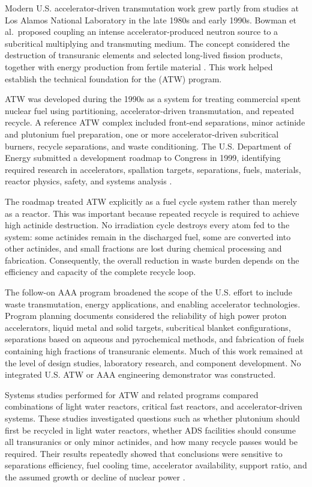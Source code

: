 Modern U.S. accelerator-driven transmutation work grew partly from studies at
Los Alamos National Laboratory in the late 1980s and early 1990s. Bowman
et al.\ proposed coupling an intense accelerator-produced neutron source to a
subcritical multiplying and transmuting medium. The concept considered the
destruction of transuranic elements and selected long-lived fission products,
together with energy production from fertile material
\cite{bowman_nuclear_1992}. This work helped establish the
technical foundation for the (\gls{ATW})
program.

\gls{ATW} was developed during the 1990s as a system for treating commercial spent
nuclear fuel using partitioning, accelerator-driven transmutation, and
repeated recycle. A reference \gls{ATW} complex included front-end separations,
minor actinide and plutonium fuel preparation, one or more accelerator-driven
subcritical burners, recycle separations, and waste conditioning. The U.S.
Department of Energy submitted a development roadmap to Congress in 1999,
identifying required research in accelerators, spallation targets, separations,
fuels, materials, reactor physics, safety, and systems analysis
\cite{vantuyleRoadmapDevelopingATW2001,bellerUSAcceleratorTransmutation2001}.

The roadmap treated \gls{ATW} explicitly as a fuel cycle system rather than merely
as a reactor. This was important because repeated recycle is required to
achieve high actinide destruction. No irradiation cycle destroys every atom
fed to the system: some actinides remain in the discharged fuel, some are
converted into other actinides, and small fractions are lost during chemical
processing and fabrication. Consequently, the overall reduction in waste
burden depends on the efficiency and capacity of the complete recycle loop.

The follow-on \gls{AAA} program broadened the
scope of the U.S. effort to include waste transmutation, energy applications,
and enabling accelerator technologies. Program planning documents considered
the reliability of high power proton accelerators, liquid metal and solid
targets, subcritical blanket configurations, separations based on aqueous and
pyrochemical methods, and fabrication of fuels containing high fractions of
transuranic elements. Much of this work
remained at the level of design studies, laboratory research, and component
development. No integrated U.S. \gls{ATW} or \gls{AAA} engineering demonstrator was
constructed.

Systems studies performed for \gls{ATW} and related programs compared combinations
of light water reactors, critical fast reactors, and accelerator-driven
systems. These studies investigated questions such as whether plutonium
should first be recycled in light water reactors, whether \gls{ADS} facilities
should consume all transuranics or only minor actinides, and how many recycle
passes would be required. Their results repeatedly showed that conclusions
were sensitive to separations efficiency, fuel cooling time, accelerator
availability, support ratio, and the assumed growth or decline of nuclear
power \cite{vantuyleRoadmapDevelopingATW2001,bellerUSAcceleratorTransmutation2001}.


